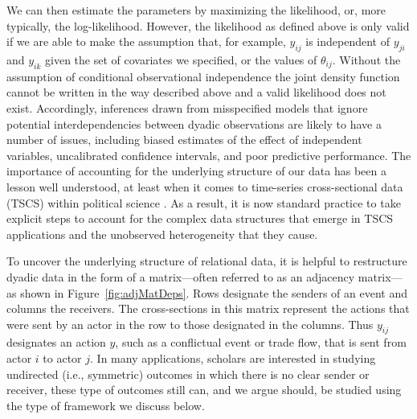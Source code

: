 \documentclass[12pt]{amsart}
\begin{document}
We can then estimate the parameters by maximizing the likelihood, or, more typically, the log-likelihood. However, the likelihood as defined above is only valid if we are able to make the assumption that, for example, $y_{ij}$ is independent of $y_{ji}$ and $y_{ik}$ given the set of covariates we specified, or the values of $\theta_{ij}$. Without the assumption of conditional observational independence the joint density function cannot be written in the way described above and a valid likelihood does not exist. Accordingly, inferences drawn from misspecified models that ignore potential interdependencies between dyadic observations are likely to have a number of issues, including biased estimates of the effect of independent variables, uncalibrated confidence intervals, and poor predictive performance. The importance of accounting for the underlying structure of our data has been a lesson well understood, at least when it comes to time-series cross-sectional data (TSCS) within political science \citep{beck:katz:1995,beck:etal:1998}. As a result, it is now standard practice to take explicit steps to account for the complex data structures that emerge in TSCS applications and the unobserved heterogeneity that they cause.

To uncover the underlying structure of relational data, it is helpful to restructure dyadic data in the form of a matrix---often referred to as an adjacency matrix---as shown in Figure~\ref{fig:adjMatDeps}. Rows designate the senders of an event and columns the receivers. The cross-sections in this matrix represent the actions that were sent by an actor in the row to those designated in the columns. Thus $y_{ij}$ designates an action $y$, such as a conflictual event or trade flow, that is sent from actor $i$ to actor $j$. In many applications, scholars are interested in studying undirected (i.e., symmetric) outcomes in which there is no clear sender or receiver, these type of outcomes still can, and we argue should, be studied using the type of framework we discuss below.
\end{document}
